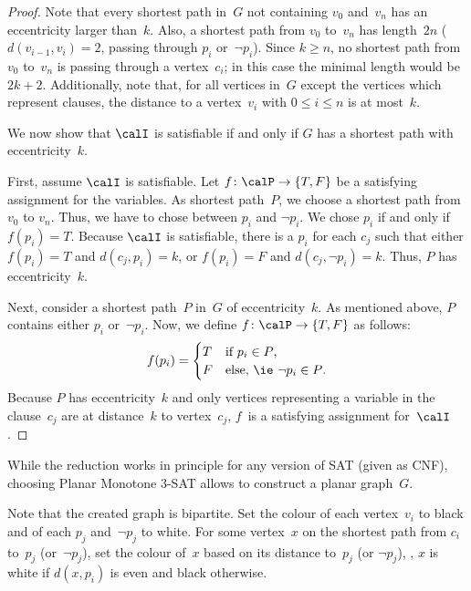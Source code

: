 \begin{proof}
Note that every shortest path in~$G$ not containing $v_0$ and~$v_n$ has an eccentricity larger than~$k$.
Also, a shortest path from $v_0$ to~$v_n$ has length~$2n$ ($d(v_{i-1}, v_i) = 2$, passing through $p_i$ or~$\neg p_i$).
Since $k \geq n$, no shortest path from $v_0$ to~$v_n$ is passing through a vertex~$c_i$; in this case the minimal length would be $2k + 2$.
Additionally, note that, for all vertices in~$G$ except the vertices which represent clauses, the distance to a vertex~$v_i$ with $0 \leq i \leq n$ is at most~$k$.

We now show that $\calI$ is satisfiable if and only if $G$ has a shortest path with eccentricity~$k$.

First, assume $\calI$ is satisfiable.
Let $f\colon \calP \rightarrow \{ T, F \}$ be a satisfying assignment for the variables.
As shortest path~$P$, we choose a shortest path from $v_0$ to $v_n$.
Thus, we have to chose between $p_i$ and $\neg p_i$.
We chose $p_i$ if and only if $f(p_i) = T$.
Because $\calI$ is satisfiable, there is a $p_i$ for each $c_j$ such that either $f(p_i) = T$ and $d(c_j,p_i) = k$, or $f(p_i) = F$ and $d(c_j, \neg p_i) = k$.
Thus, $P$ has eccentricity~$k$.

Next, consider a shortest path~$P$ in~$G$ of eccentricity~$k$.
As mentioned above, $P$ contains either $p_i$ or~$\neg p_i$.
Now, we define $f\colon \calP \rightarrow \{ T, F \}$ as follows:
\[
    f(p_i) =
        \begin{cases}
            T & \text{if $p_i \in P$,} \\
            F & \text{else, \ie $\neg p_i \in P$.} \\
        \end{cases}
\]
Because $P$ has eccentricity~$k$ and only vertices representing a variable in the clause~$c_j$ are at distance~$k$ to vertex~$c_j$, $f$~is a satisfying assignment for~$\calI$.
\end{proof}

While the reduction works in principle for any version of SAT (given as CNF), choosing Planar Monotone 3-SAT allows to construct a planar graph~$G$.

Note that the created graph is bipartite.
Set the colour of each vertex~$v_i$ to black and of each $p_j$ and~$\neg p_j$ to white.
For some vertex~$x$ on the shortest path from $c_i$ to~$p_j$ (or~$\neg p_j$), set the colour of~$x$ based on its distance to~$p_j$ (or $\neg p_j$), \ie, $x$ is white if $d(x, p_i)$ is even and black otherwise.

